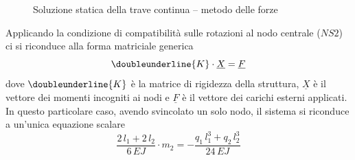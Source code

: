 \begin{figure}[t]
	\centering
    \caption{Soluzione statica della trave continua -- metodo delle forze}
    \label{fig:staticSolution}
\end{figure}

Applicando la condizione di compatibilità sulle rotazioni al nodo centrale ($NS2$) ci si riconduce alla forma matriciale generica
\[
	\doubleunderline{K}\cdot \underline{X} = \underline{F}
\]
dove $\doubleunderline{K}$ è la matrice di rigidezza della struttura, $\underline{X}$ è il vettore dei momenti incogniti ai nodi e $\underline{F}$ è il vettore dei carichi esterni applicati.  
In questo particolare caso, avendo svincolato un solo nodo, il sistema si riconduce a un'unica equazione scalare
\[
	\dfrac{2\,l_1 + 2\,l_2}{6\,EJ} \cdot m_2 = -\dfrac{q_1\,l_1^3 + q_2\,l_2^3}{24\,EJ}
\]

